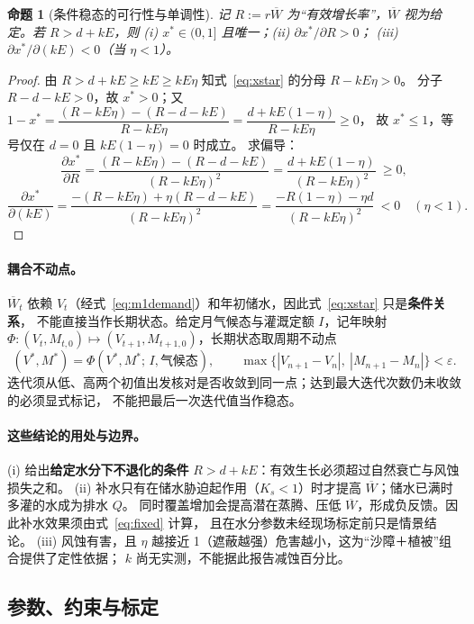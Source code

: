 \documentclass[11pt,a4paper]{ctexart}
\newtheorem{proposition}{命题}
\begin{document}
\begin{proposition}[条件稳态的可行性与单调性]\label{prop:steady}
记 $R:=r\overline W$ 为“有效增长率”，$\overline W$ 视为给定。若 $R>d+kE$，则
(i) $x^*\in(0,1]$ 且唯一；(ii) $\partial x^*/\partial R>0$；
(iii) $\partial x^*/\partial(kE)<0$（当 $\eta<1$）。
\end{proposition}
\begin{proof}
由 $R>d+kE\ge kE\ge kE\eta$ 知式~\eqref{eq:xstar} 的分母 $R-kE\eta>0$。
分子 $R-d-kE>0$，故 $x^*>0$；又
$1-x^*=\dfrac{(R-kE\eta)-(R-d-kE)}{R-kE\eta}=\dfrac{d+kE(1-\eta)}{R-kE\eta}\ge0$，
故 $x^*\le1$，等号仅在 $d=0$ 且 $kE(1-\eta)=0$ 时成立。
求偏导：
\[
\frac{\partial x^*}{\partial R}=\frac{(R-kE\eta)-(R-d-kE)}{(R-kE\eta)^2}
=\frac{d+kE(1-\eta)}{(R-kE\eta)^2}\ \ge 0,
\]
\[
\frac{\partial x^*}{\partial(kE)}
=\frac{-(R-kE\eta)+\eta(R-d-kE)}{(R-kE\eta)^2}
=\frac{-R(1-\eta)-\eta d}{(R-kE\eta)^2}\ <0\quad(\eta<1).
\]
\end{proof}

\paragraph{耦合不动点。}
$\overline W_t$ 依赖 $V_t$（经式~\eqref{eq:m1demand}）和年初储水，因此式~\eqref{eq:xstar} 只是\textbf{条件关系}，
不能直接当作长期状态。给定月气候态与灌溉定额 $I$，记年映射
$\Phi:(V_t,M_{t,0})\mapsto(V_{t+1},M_{t+1,0})$，长期状态取周期不动点
\begin{equation}\label{eq:fixed}
(V^*,M^*)=\Phi(V^*,M^*;\,I,\text{气候态}),\qquad
\max\{|V_{n+1}-V_n|,\ |M_{n+1}-M_n|\}<\varepsilon .
\end{equation}
迭代须从低、高两个初值出发核对是否收敛到同一点；达到最大迭代次数仍未收敛的必须显式标记，
不能把最后一次迭代值当作稳态。

\paragraph{这些结论的用处与边界。}
(i) 给出\textbf{给定水分下不退化的条件} $R>d+kE$：有效生长必须超过自然衰亡与风蚀损失之和。
(ii) 补水只有在储水胁迫起作用（$K_s<1$）时才提高 $\overline W$；储水已满时多灌的水成为排水 $Q$。
同时覆盖增加会提高潜在蒸腾、压低 $\overline W$，形成负反馈。因此补水效果须由式~\eqref{eq:fixed} 计算，
且在水分参数未经现场标定前只是情景结论。
(iii) 风蚀有害，且 $\eta$ 越接近 1（遮蔽越强）危害越小，这为“沙障＋植被”组合提供了定性依据；
$k$ 尚无实测，不能据此报告减蚀百分比。

\subsection{参数、约束与标定}
\end{document}

